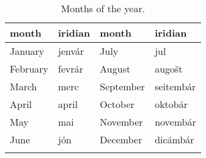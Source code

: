 \begin{table}[h!]
	\caption{Months of the year.}
	\medskip
	\small
	\begin{tabu}to 0.7 \textwidth {YYYY}
		\toprule
		{\sc month} & {\sc iridian} & {\sc month} & {\sc iridian}\\
		\midrule
		January		& jenvár	& July & jul\\
		February	& fevrár 	& August & augošt\\
		March		& merc		& September & seitembár\\
		April		& april 	& October & oktobár\\
		May 		& mai 		& November & novembár\\
		June 		& jón 		& December & dicámbár\\
		\bottomrule
		\label{30992}
	\end{tabu}
\end{table}

